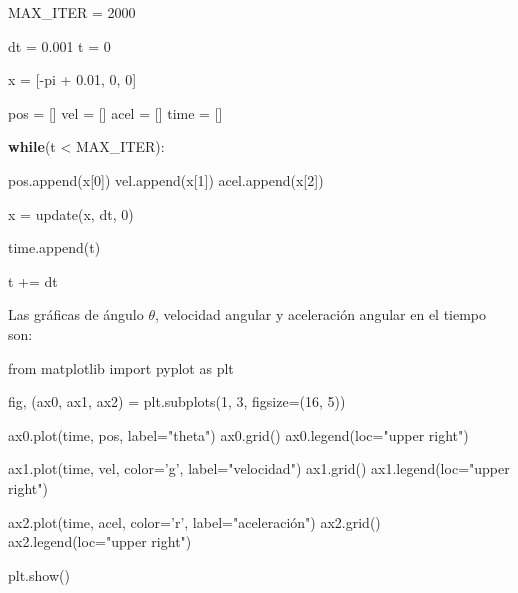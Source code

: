 \documentclass[onecolumn]{article}
\newenvironment{Shaded}{}{}
\newcommand{\ControlFlowTok}[1]{\textcolor[rgb]{0.00,0.44,0.13}{\textbf{#1}}}
\newcommand{\DecValTok}[1]{\textcolor[rgb]{0.25,0.63,0.44}{#1}}
\newcommand{\FloatTok}[1]{\textcolor[rgb]{0.25,0.63,0.44}{#1}}
\newcommand{\ImportTok}[1]{#1}
\newcommand{\NormalTok}[1]{#1}
\newcommand{\OperatorTok}[1]{\textcolor[rgb]{0.40,0.40,0.40}{#1}}
\newcommand{\StringTok}[1]{\textcolor[rgb]{0.25,0.44,0.63}{#1}}
\begin{document}
\begin{Shaded}
\begin{Highlighting}[]
\NormalTok{MAX_ITER }\OperatorTok{=} \DecValTok{2000}

\NormalTok{dt }\OperatorTok{=} \FloatTok{0.001}
\NormalTok{t }\OperatorTok{=} \DecValTok{0}

\NormalTok{x }\OperatorTok{=}\NormalTok{ [}\OperatorTok{-}\NormalTok{pi }\OperatorTok{+} \FloatTok{0.01}\NormalTok{, }\DecValTok{0}\NormalTok{, }\DecValTok{0}\NormalTok{]}

\NormalTok{pos }\OperatorTok{=}\NormalTok{ []}
\NormalTok{vel }\OperatorTok{=}\NormalTok{ []}
\NormalTok{acel }\OperatorTok{=}\NormalTok{ []}
\NormalTok{time }\OperatorTok{=}\NormalTok{ []}

\ControlFlowTok{while}\NormalTok{(t }\OperatorTok{<}\NormalTok{ MAX_ITER):}

\NormalTok{    pos.append(x[}\DecValTok{0}\NormalTok{])}
\NormalTok{    vel.append(x[}\DecValTok{1}\NormalTok{])}
\NormalTok{    acel.append(x[}\DecValTok{2}\NormalTok{])}

\NormalTok{    x }\OperatorTok{=}\NormalTok{ update(x, dt, }\DecValTok{0}\NormalTok{)}

\NormalTok{    time.append(t)}

\NormalTok{    t }\OperatorTok{+=}\NormalTok{ dt}
\end{Highlighting}
\end{Shaded}

Las gráficas de ángulo \(\theta\), velocidad angular y aceleración
angular en el tiempo son:

\begin{Shaded}
\begin{Highlighting}[]
\ImportTok{from}\NormalTok{ matplotlib }\ImportTok{import}\NormalTok{ pyplot }\ImportTok{as}\NormalTok{ plt}

\NormalTok{fig, (ax0, ax1, ax2) }\OperatorTok{=}\NormalTok{ plt.subplots(}\DecValTok{1}\NormalTok{, }\DecValTok{3}\NormalTok{, figsize}\OperatorTok{=}\NormalTok{(}\DecValTok{16}\NormalTok{, }\DecValTok{5}\NormalTok{))}

\NormalTok{ax0.plot(time, pos, label}\OperatorTok{=}\StringTok{"theta"}\NormalTok{)}
\NormalTok{ax0.grid()}
\NormalTok{ax0.legend(loc}\OperatorTok{=}\StringTok{"upper right"}\NormalTok{)}

\NormalTok{ax1.plot(time, vel, color}\OperatorTok{=}\StringTok{'g'}\NormalTok{, label}\OperatorTok{=}\StringTok{"velocidad"}\NormalTok{)}
\NormalTok{ax1.grid()}
\NormalTok{ax1.legend(loc}\OperatorTok{=}\StringTok{"upper right"}\NormalTok{)}

\NormalTok{ax2.plot(time, acel, color}\OperatorTok{=}\StringTok{'r'}\NormalTok{, label}\OperatorTok{=}\StringTok{"aceleración")}
\StringTok{ax2.grid()}
\StringTok{ax2.legend(loc="}\NormalTok{upper right}\StringTok{")}

\StringTok{plt.show()}
\end{Highlighting}
\end{Shaded}
\end{document}
